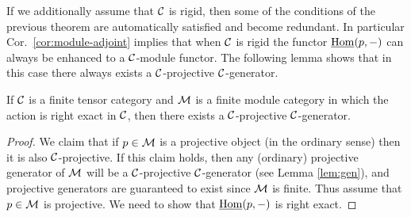 \documentclass{amsart}
\begin{document}
If we additionally assume that $\mathcal C$ is rigid, then some of the conditions of the previous theorem are automatically satisfied and become redundant. In particular Cor.~\ref{cor:module-adjoint} implies that when $\mathcal C$ is rigid the functor $\operatorname{\underline{Hom}}(p,-)$ can always be enhanced to a $\mathcal C$-module functor.  The following lemma shows that in this case there always exists a $\mathcal C$-projective $\mathcal C$-generator.  
\begin{lemma}{\cite[\S 2.11]{EGNO}} \label{lma:Enough_C-projs}
	If $\mathcal C$ is a finite tensor category and $\mathcal M$ is a finite module category in which the action is right exact in $\mathcal C$, then there exists a $\mathcal C$-projective $\mathcal C$-generator.   
\end{lemma}   
\begin{proof}
	We claim that if $p \in \mathcal M$ is a projective object (in the ordinary sense) then it is also $\mathcal C$-projective. If this claim holds, then any (ordinary) projective generator of $\mathcal M$ will be a $\mathcal C$-projective $\mathcal C$-generator (see Lemma \ref{lem:gen}), and projective generators are guaranteed to exist since $\mathcal M$ is finite.  
	Thus assume that $p \in \mathcal M$ is projective.  We need to show that $\operatorname{\underline{Hom}}(p, -)$ is right exact. 
	

\end{proof}
\end{document}
